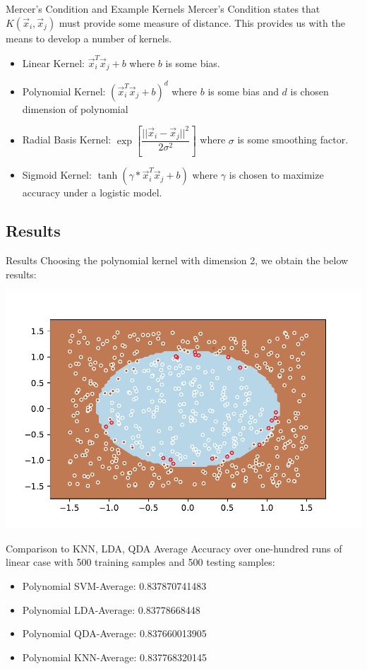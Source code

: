 \documentclass{beamer}
\begin{document}
\begin{frame}{Mercer's Condition and Example Kernels}
Mercer's Condition states that $K(\vec{x}_i, \vec{x}_j)$ must provide some measure of distance. This provides us with the means to develop a number of kernels.
\begin{itemize}
\item Linear Kernel: $\vec{x}_i^T\vec{x}_j + b$ where $b$ is some bias.
\item Polynomial Kernel: $(\vec{x}_i^T\vec{x}_j + b)^d$ where $b$ is some bias and $d$ is chosen dimension of polynomial
\item Radial Basis Kernel: $\exp\left[ \dfrac{||\vec{x}_i - \vec{x}_j ||^2}{2\sigma^2}   \right]$ where $\sigma$ is some smoothing factor.
\item Sigmoid Kernel: $\tanh(\gamma * \vec{x}_i^T\vec{x}_j + b)$ where $\gamma$ is chosen to maximize accuracy under a logistic model.
\end{itemize}
\end{frame}

\subsection{Results}
\begin{frame}{Results}
Choosing the polynomial kernel with dimension 2, we obtain the below results:
\begin{center}
\includegraphics[scale=.6]{polynomialcase.pdf}
\end{center}
\end{frame}

\begin{frame}{Comparison to KNN, LDA, QDA}
Average Accuracy over one-hundred runs of linear case with 500 training samples and 500 testing samples:
\begin{itemize}
\item Polynomial SVM-Average: 0.837870741483
\item Polynomial LDA-Average: 0.83778668448
\item Polynomial QDA-Average: 0.837660013905
\item Polynomial KNN-Average: 0.837768320145
\end{itemize}
\end{frame}
\end{document}
